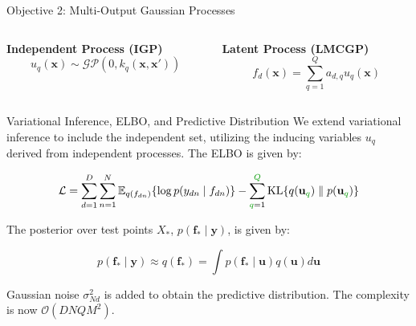 \begin{frame}{Objective 2: Multi-Output Gaussian Processes}
	\centering
	\setlength{} 
	\setlength{}
	
	
	\begin{columns}[T] %

		\begin{column}{0.5\textwidth}
			\centering
	\textcolor{mygreen}{
		\textbf{Independent Process (IGP)}
		\begin{equation*}
			u_{q}(\mathbf{x}) \sim \mathcal{GP}(0, k_{q}(\mathbf{x}, \mathbf{x}'))
		\end{equation*}
	}
	\end{column}
	
	
	\begin{column}{0.5\textwidth}
		\centering
		\textcolor{myblue}{
			\textbf{Latent Process (LMCGP)}
			\begin{equation*}
				f_{d}(\mathbf{x}) = \sum_{q=1}^Q a_{d,q} u_{q}(\mathbf{x})
			\end{equation*}	
		}
	\end{column}
	
	\end{columns}
\end{frame}


\begin{frame}{Variational Inference, ELBO, and Predictive Distribution}
	We extend variational inference to include the independent set, utilizing the inducing variables $u_q$ derived from independent processes. The ELBO is given by:
	
	\begin{equation*}\label{eq:lmc_elbo}
		\mathcal{L} = \sum_{d=1}^D\sum_{n=1}^{N} \mathbb{E}_{q(f_{dn})}\{\log p(y_{dn} \mid f_{dn})\} - \sum_{{\textcolor{mygreen}{q}}=1}^{\textcolor{mygreen}{Q}} \text{KL}\{q(\mathbf{u}_{\textcolor{mygreen}{q}})\parallel p(\mathbf{u}_{\textcolor{mygreen}{q}})\}
	\end{equation*}
	
	The posterior over test points $X_*$, $p(\mathbf{f}_* \mid \mathbf{y})$, is given by:
	
	\begin{equation*}
		p(\mathbf{f}_* \mid \mathbf{y}) \approx q(\mathbf{f}_*) = \int p(\mathbf{f}_* \mid \mathbf{u}) q(\mathbf{u}) d \mathbf{u}
	\end{equation*}
	
	Gaussian noise $\sigma_{Nd}^2$ is added to obtain the predictive distribution. The complexity is now \textcolor{mygreen}{$\mathcal{O}(DNQM^2)$}.
\end{frame}

